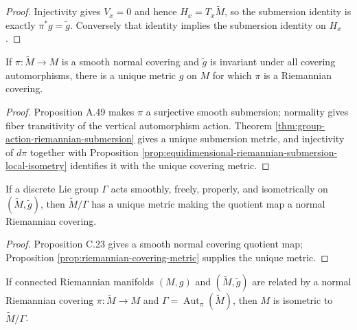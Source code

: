 \begin{proof}
\leanok
\sketch Injectivity gives $V_x=0$ and hence $H_x=T_x\tilde M$, so the submersion identity is exactly $\pi^*g=\tilde g$. Conversely that identity implies the submersion identity on $H_x$.
\end{proof}

\begin{proposition}
\label{prop:riemannian-covering-metric}
\leanok
{}
If $\pi:\tilde M\to M$ is a smooth normal covering and $\tilde g$ is invariant under all covering automorphisms, there is a unique metric $g$ on $M$ for which $\pi$ is a Riemannian covering.
\end{proposition}

\begin{proof}
\leanok
\sketch Proposition A.49 makes $\pi$ a surjective smooth submersion; normality gives fiber transitivity of the vertical automorphism action. Theorem \ref{thm:group-action-riemannian-submersion} gives a unique submersion metric, and injectivity of $d\pi$ together with Proposition \ref{prop:equidimensional-riemannian-submersion-local-isometry} identifies it with the unique covering metric.
\end{proof}

\begin{proposition}
\label{prop:riemannian-quotient-metric}
If a discrete Lie group $\Gamma$ acts smoothly, freely, properly, and isometrically on $(\widetilde M,\tilde g)$, then $\widetilde M/\Gamma$ has a unique metric making the quotient map a normal Riemannian covering.
\end{proposition}

\begin{proof}
\sketch Proposition C.23 gives a smooth normal covering quotient map; Proposition \ref{prop:riemannian-covering-metric} supplies the unique metric.
\end{proof}

\begin{corollary}
\label{cor:isometric-to-quotient}
If connected Riemannian manifolds $(M,g)$ and $(\widetilde M,\tilde g)$ are related by a normal Riemannian covering $\pi:\widetilde M\to M$ and $\Gamma=\operatorname{Aut}_\pi(\widetilde M)$, then $M$ is isometric to $\widetilde M/\Gamma$.
\end{corollary}


